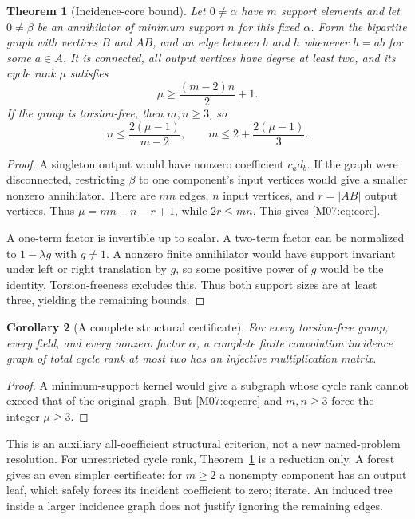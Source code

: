 \documentclass[11pt,a4paper,oneside]{report}
\newtheorem{theorem}{Theorem}[section]
\newtheorem{corollary}[theorem]{Corollary}
\theoremstyle{definition}
\theoremstyle{remark}
\begin{document}
\begin{theorem}[Incidence-core bound]\label{M07:thm:core}
Let $0\ne\alpha$ have $m$ support elements and let $0\ne\beta$
be an annihilator of minimum support $n$ for this fixed $\alpha$.
Form the bipartite graph with vertices $B$ and $AB$, and an edge
between $b$ and $h$ whenever $h=ab$ for some $a\in A$.
It is connected, all output vertices have degree at least two,
and its cycle rank $\mu$ satisfies
\begin{equation}\label{M07:eq:core}
\mu\ge\frac{(m-2)n}{2}+1.
\end{equation}
If the group is torsion-free, then $m,n\ge3$, so
\[
n\le\frac{2(\mu-1)}{m-2},\qquad
m\le2+\frac{2(\mu-1)}3.
\]
\end{theorem}
\begin{proof}
A singleton output would have nonzero coefficient $c_a d_b$.
If the graph were disconnected, restricting $\beta$ to one
component's input vertices would give a smaller nonzero annihilator.
There are $mn$ edges, $n$ input vertices, and $r=|AB|$ output
vertices. Thus $\mu=mn-n-r+1$, while $2r\le mn$.
This gives \eqref{M07:eq:core}.

A one-term factor is invertible up to scalar. A two-term factor
can be normalized to $1-\lambda g$ with $g\ne1$. A nonzero
finite annihilator would have support invariant under left or
right translation by $g$, so some positive power of $g$ would
be the identity. Torsion-freeness excludes this. Thus both
support sizes are at least three, yielding the remaining bounds.
\end{proof}

\begin{corollary}[A complete structural certificate]\label{M07:cor:two}
For every torsion-free group, every field, and every nonzero
factor $\alpha$, a complete finite convolution incidence graph
of total cycle rank at most two has an injective multiplication matrix.
\end{corollary}
\begin{proof}
A minimum-support kernel would give a subgraph whose cycle
rank cannot exceed that of the original graph. But
\eqref{M07:eq:core} and $m,n\ge3$ force the integer $\mu\ge3$.
\end{proof}
This is an auxiliary all-coefficient structural criterion, not
a new named-problem resolution. For unrestricted cycle rank,
Theorem~\ref{M07:thm:core} is a reduction only. A forest gives an
even simpler certificate: for $m\ge2$ a nonempty component
has an output leaf, which safely forces its incident coefficient
to zero; iterate. An induced tree inside a larger incidence
graph does not justify ignoring the remaining edges.
\end{document}
